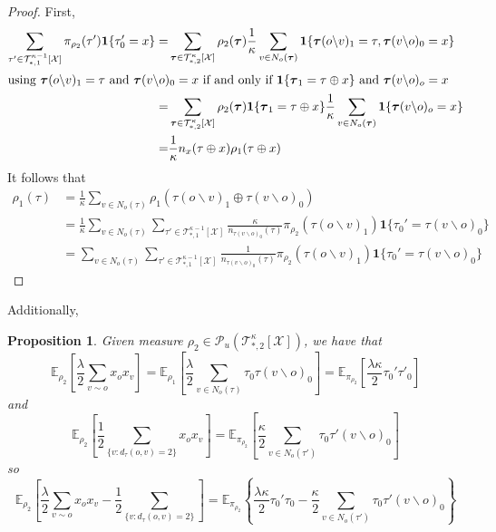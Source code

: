 \documentclass[12pt]{article}
\newtheorem{proposition}[theorem]{Proposition}
\newcommand{\one}[1]{\mathbf{1}\{#1\}}
\newcommand{\tree}[2]{\mathcal{T}_{*, #1}^{#2}[\mathcal{X}]}
\newcommand{\measure}[2]{\mathcal{P}_u(\mathcal{T}_{*, #1}^{#2}[\mathcal{X}])}
\newcommand{\TB}{{ \boldsymbol\tau}}
\numberwithin{equation}{section}
\begin{document}
\begin{proof}
    First,
    \begin{align*}
        \sum_{\tau'\in\tree{1}{\kappa-1}}\pi_{\rho_2}(\tau')\one{\tau_0'=x}
        = & \sum_{\TB\in\tree{2}{\kappa}}\rho_2(\TB)\frac1\kappa \sum_{v\in N_o(\TB)}\one{\TB(o\backslash v)_1 = \tau, \TB(v\backslash o)_0=x} \\
        \intertext{using $\TB(o\backslash v)_1 = \tau$ and $\TB(v\backslash o)_0=x$ if and only if $\one{\TB_1 = \tau\oplus x}
            $ and $\TB(v\backslash o)_o=x$}
        = & \sum_{\TB\in\tree{2}{\kappa}}\rho_2(\TB)\one{\TB_1 = \tau\oplus x} \frac1\kappa \sum_{v\in N_o(\TB)}\one{\TB(v\backslash o)_o=x}   \\
        = & \frac1\kappa n_x(\tau\oplus x)\rho_1(\tau\oplus x)
    \end{align*}
    It follows that
    \begin{align*}
        \rho_1(\tau) & = \frac1\kappa\sum_{v\in N_o(\tau)}\rho_1(\tau(o\backslash v)_1\oplus \tau(v\backslash o)_0)                                                                                               \\
                     & = \frac1\kappa\sum_{v\in N_o(\tau)}\sum_{\tau'\in\tree{1}{\kappa-1}}\frac{\kappa}{ n_{\tau(v\backslash o)_0}(\tau)}\pi_{\rho_2}(\tau(o\backslash v)_1)\one{\tau_0'= \tau(v\backslash o)_0} \\
                     & = \sum_{v\in N_o(\tau)}\sum_{\tau'\in\tree{1}{\kappa-1}}\frac{1}{n_{\tau(v\backslash o)_0}(\tau)}\pi_{\rho_2}(\tau(o\backslash v)_1)\one{\tau_0'= \tau(v\backslash o)_0}
    \end{align*}
\end{proof}

Additionally,
\begin{proposition}
    Given measure $\rho_2\in\measure{2}{\kappa}$, we have that
    \begin{equation*}
        \mathbb{E}_{\rho_2}\left[\frac\lambda2\sum_{v\sim o} x_o x_v\right] = \mathbb{E}_{\rho_1}\left[\frac\lambda2\sum_{v\in N_o(\tau)} \tau_0\tau(v\backslash o)_0\right] = \mathbb{E}_{\pi_{\rho_2}}\left[\frac{\lambda\kappa}2\tau_0'\tau'_0\right]
    \end{equation*}
    and
    \begin{equation*}
        \mathbb{E}_{\rho_2}\left[\frac12\sum_{\{v:d_\tau(o, v)=2\}} x_o x_v\right] = \mathbb{E}_{\pi_{\rho_2}}\left[\frac\kappa 2\sum_{v\in N_o(\tau')} \tau_0\tau'(v\backslash o)_0\right]
    \end{equation*}
    so
    \begin{equation*}
        \mathbb{E}_{\rho_2}\left[\frac\lambda2\sum_{v\sim o} x_o x_v - \frac12\sum_{\{v:d_\tau(o, v)=2\}}\right] =\mathbb{E}_{\pi_{\rho_2}}
        \left\{\frac{\lambda\kappa}2\tau_0'\tau_0 - \frac\kappa 2\sum_{v\in N_o(\tau')} \tau_0\tau'(v\backslash o)_0\right\}
    \end{equation*}
\end{proposition}
\end{document}
